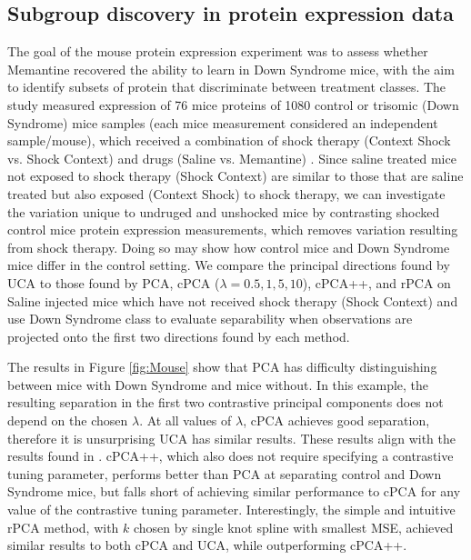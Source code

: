 \documentclass[12pt]{article}
\begin{document}
\subsection{Subgroup discovery in protein expression data}
The goal of the mouse protein expression experiment was to assess whether Memantine recovered the ability to learn in Down Syndrome mice, with the aim to identify subsets of protein that discriminate between treatment classes.
 The study measured expression of 76 mice proteins of 1080 control or trisomic (Down Syndrome) mice samples (each mice measurement considered an independent sample/mouse), which received a combination of shock therapy (Context Shock vs. Shock Context) and drugs (Saline vs. Memantine)  \cite{Ahmed, Higuera, Abid}.  
Since saline treated mice not exposed to shock therapy (Shock Context) are similar to those that are saline treated but also exposed (Context Shock) to shock therapy, we can investigate the variation unique to undruged and unshocked mice by contrasting shocked control mice protein expression measurements, which removes variation resulting from shock therapy. Doing so may show how control mice and Down Syndrome mice differ in the control setting.
We compare the principal directions found by UCA to those found by PCA, cPCA ($\lambda = 0.5, 1, 5, 10$), cPCA++, and rPCA on Saline injected mice which have not received shock therapy (Shock Context) and use Down Syndrome class to evaluate separability when observations are projected onto the first two directions found by each method.

The results in Figure \ref{fig:Mouse} show that PCA has difficulty distinguishing between mice with Down Syndrome and mice without.  In this example, the resulting separation in the first two contrastive principal components does not depend on the chosen $\lambda$. At all values of $\lambda$, cPCA achieves good separation, therefore it is unsurprising UCA has similar results. These results align with the results found in  \cite{Abid}.
cPCA++, which also does not require specifying a contrastive tuning parameter, performs better than PCA at separating control and Down Syndrome mice, but falls short of achieving similar performance to cPCA for any value of the contrastive tuning parameter. Interestingly, the simple and intuitive rPCA method, with $k$ chosen by single knot spline with smallest MSE, achieved similar results to both cPCA and UCA, while outperforming cPCA++.
\end{document}
